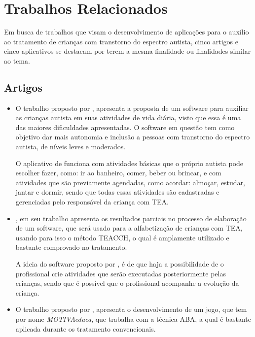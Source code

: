\chapter{Trabalhos Relacionados}\label{cap:relacionados}
Em busca de trabalhos que visam o desenvolvimento de aplicações para o auxílio ao tratamento de crianças com transtorno do espectro autista, cinco artigos e cinco aplicativos se destacam por terem a mesma finalidade ou finalidades similar ao tema.


\section{Artigos}
\begin{itemize}
	\item O trabalho proposto por , apresenta a proposta de um software para auxiliar as crianças autista em suas atividades de vida diária, visto que essa é uma das maiores dificuldades apresentadas. O software em questão tem como objetivo dar mais autonomia e inclusão a pessoas com transtorno do espectro autista, de níveis leves e moderados.
	
	O aplicativo de  funciona com atividades básicas que o próprio autista pode escolher fazer, como: ir ao banheiro, comer, beber ou brincar, e com atividades que são previamente agendadas, como acordar: almoçar, estudar, jantar e dormir, sendo que todas essas atividades são cadastradas e gerenciadas pelo responsável da criança com TEA.
	
	\item {}, em seu trabalho apresenta os resultados parciais no processo de elaboração de um software, que será usado para a alfabetização de crianças com TEA, usando para isso o método TEACCH, o qual é amplamente utilizado e bastante comprovado no tratamento.
	
	A ideia do software proposto por , é de que haja a possibilidade de o profissional crie atividades que serão executadas posteriormente pelas crianças, sendo que é possível que o profissional acompanhe a evolução da criança.
	
	\item O trabalho proposto por , apresenta o desenvolvimento de um jogo, que tem por nome \textit{MOTIVAeduca}, que trabalha com a técnica ABA, a qual é bastante aplicada durante os tratamento convencionais.
	

\end{itemize}
